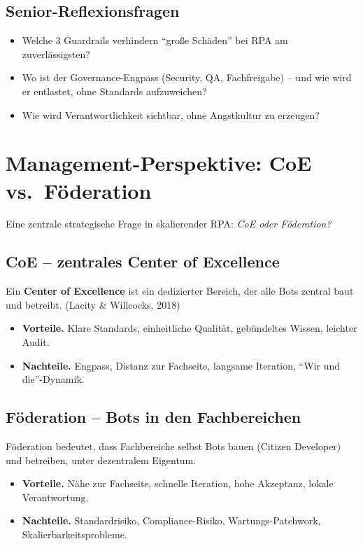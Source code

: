 \documentclass[11pt,a4paper,oneside]{article}
\newcommand{\fachbegriff}[1]{\textbf{#1}}
\newcommand{\quelle}[1]{{\footnotesize\color{lpGray}(#1)}}
\begin{document}
\subsection{Senior-Reflexionsfragen}

\begin{itemize}
  \item Welche 3 Guardrails verhindern ``große Schäden'' bei RPA am zuverlässigsten?
  \item Wo ist der Governance-Engpass (Security, QA, Fachfreigabe) -- und wie wird er entlastet, ohne Standards aufzuweichen?
  \item Wie wird Verantwortlichkeit sichtbar, ohne Angstkultur zu erzeugen?
\end{itemize}

\section{Management-Perspektive: CoE vs.\ Föderation}

Eine zentrale strategische Frage in skalierender RPA: \emph{CoE oder Föderation?}

\subsection{CoE -- zentrales Center of Excellence}

Ein \fachbegriff{Center of Excellence} ist ein dedizierter Bereich, der alle Bots zentral baut und betreibt. \quelle{Lacity \& Willcocks, 2018}

\begin{itemize}
  \item \textbf{Vorteile.} Klare Standards, einheitliche Qualität, gebündeltes Wissen, leichter Audit.
  \item \textbf{Nachteile.} Engpass, Distanz zur Fachseite, langsame Iteration, ``Wir und die''-Dynamik.
\end{itemize}

\subsection{Föderation -- Bots in den Fachbereichen}

Föderation bedeutet, dass Fachbereiche selbst Bots bauen (Citizen Developer) und betreiben, unter dezentralem Eigentum.

\begin{itemize}
  \item \textbf{Vorteile.} Nähe zur Fachseite, schnelle Iteration, hohe Akzeptanz, lokale Verantwortung.
  \item \textbf{Nachteile.} Standardrisiko, Compliance-Risiko, Wartungs-Patchwork, Skalierbarkeitsprobleme.
\end{itemize}
\end{document}
